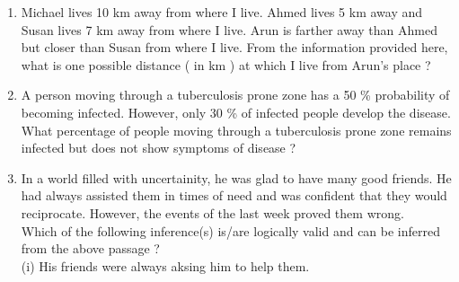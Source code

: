 \documentclass[journal]{IEEEtran}
\begin{document}
\begin{enumerate}
		\begin{enumerate}
		\end{enumerate}
	\item Michael lives 10 km away from where I live. Ahmed lives 5 km away and Susan lives 7 km away from where I live. Arun is farther away than Ahmed but closer than Susan from where I live. From the information provided here, what is one possible distance ( in km ) at which I live from Arun's place ?
		\begin{enumerate}
				\begin{multicols}{4}
				\item 3.00
				\item 4.99
				\item 6.02
				\item 7.01
				\end{multicols}
		\end{enumerate}
	\item A person moving through a tuberculosis prone zone has a 50 \% probability of becoming infected. However, only 30 \% of infected people develop the disease. What percentage of people moving through a tuberculosis prone zone remains infected but does not show symptoms of disease ?
		\begin{enumerate}
				\begin{multicols}{4}
				\item 15
				\item 33
				\item 35
				\item 37
				\end{multicols}
		\end{enumerate}
	\item In a world filled with uncertainity, he was glad to have many good friends. He had always assisted them in times of need and was confident that they would reciprocate. However, the events of the last week proved them wrong. \\
		Which of the following inference(s) is/are logically valid and can be inferred from the above passage ? \\
		(i) His friends were always aksing him to help them. \\

\end{enumerate}
\end{document}
